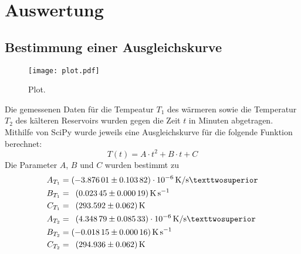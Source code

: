 \section{Auswertung}
\label{sec:Auswertung}

\subsection{Bestimmung einer Ausgleichskurve}
\begin{figure}
  \centering
  \texttt{[image: plot.pdf]}
  \caption{Plot.}
  \label{fig:plot}
\end{figure}
Die gemessenen Daten für die Tempeatur $T_1$ des wärmeren sowie die Temperatur
$T_2$ des kälteren Reservoirs wurden gegen die Zeit $t$ in Minuten abgetragen.
Mithilfe von SciPy wurde jeweils eine Ausgleichskurve für die folgende Funktion
berechnet:
\begin{equation}
  T(t)=A \cdot t^2 + B \cdot t + C
\end{equation}
Die Parameter $A$, $B$ und $C$ wurden bestimmt zu
\begin{align*}
A_{T_1} &= \SI{-3.87601 +- 0.10382e-6}{\kelvin\per\second²} \\
B_{T_1} &= \phantom{1}\SI{0.02345 +- 0.00019}{\kelvin\per\second} \\
C_{T_1} &= \phantom{1}\SI{293.592 +- 0.062}{\kelvin} \\
A_{T_2} &= \phantom{1}\SI{4.34879 +- 0.08533e-6}{\kelvin\per\second²}  \\
 B_{T_2} &= \SI{-0.01815 +- 0.00016}{\kelvin\per\second} \\
  C_{T_2} &= \phantom{1}\SI{294.936 +- 0.062}{\kelvin}
\end{align*}

